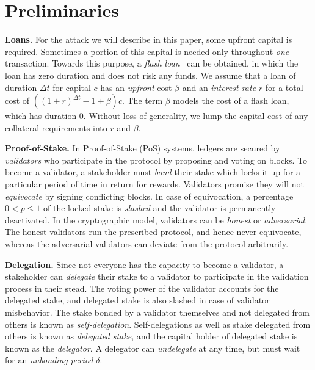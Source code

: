\section{Preliminaries}\label{sec:preliminaries}


\noindent
\textbf{Loans.} For the attack we will describe in this paper, some upfront
capital is required. Sometimes a portion of this capital is needed only throughout \emph{one}
transaction. Towards this purpose, a \emph{flash loan}~\cite{gudgeon2020defi} can
be obtained, in which the loan has zero duration and does not risk any funds. We assume that
a loan of duration $\Delta t$ for capital $c$ has an \emph{upfront} cost $\beta$
and an \emph{interest rate} $r$ for a total cost of
$((1 + r)^{\Delta t} - 1 + \beta) c$. The term $\beta$ models the cost of a flash loan,
which has duration $0$. Without loss of generality, we lump the capital cost of any
collateral requirements into $r$ and $\beta$.

\noindent
\textbf{Proof-of-Stake.} In Proof-of-Stake (PoS) systems, ledgers are secured
by \emph{validators} who participate in the protocol by proposing and voting
on blocks. To become a validator, a stakeholder must \emph{bond} their stake
which locks it up for a particular period of time in return for rewards.
Validators promise they will
not \emph{equivocate} by signing conflicting blocks.
In case of equivocation, a percentage $0 < p \leq 1$ of the locked stake is
\emph{slashed} and the validator is permanently deactivated. In the cryptographic
model, validators can be \emph{honest} or \emph{adversarial}. The honest validators
run the prescribed protocol, and hence never equivocate, whereas the adversarial
validators can deviate from the protocol arbitrarily.


\noindent
\textbf{Delegation.} Since not everyone has the capacity to become a validator,
a stakeholder can \emph{delegate} their stake to a validator to participate in
the validation process in their stead. The voting power of the validator accounts
for the delegated stake, and delegated stake is also slashed in case of validator
misbehavior. The stake bonded by a validator themselves and not delegated from
others is known as \emph{self-delegation}. Self-delegations as
well as stake delegated from others is known as \emph{delegated stake},
and the capital holder of delegated stake is known as the \emph{delegator}.
A delegator can \emph{undelegate} at any time, but must wait for an
\emph{unbonding period} $\delta$.

